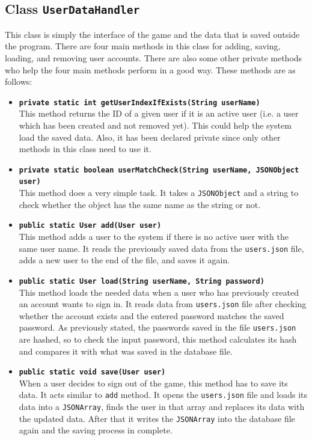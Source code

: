 \documentclass[a4paper]{article}
\begin{document}
\subsection{Class \texttt{UserDataHandler}}
This class is simply the interface of the game and the data that is saved outside the program. There are four main methods in this class for adding, saving, loading, and removing user accounts. There are also some other private methods who help the four main methods perform in a good way. These methods are as follows:
\begin{itemize}
	\item \texttt{\textbf{private static int getUserIndexIfExists(String userName)}}\\
	This method returns the ID of a given user if it is an active user (i.e. a user which has been created and not removed yet). This could help the system load the saved data. Also, it has been declared private since only other methods in this class need to use it.
	
	\item \texttt{\textbf{private static boolean userMatchCheck(String userName, JSONObject user)}}\\
	This method does a very simple task. It takes a \texttt{JSONObject} and a string to check whether the object has the same name as the string or not.
	
	\item \texttt{\textbf{public static User add(User user)}}\\
	This method adds a user to the system if there is no active user with the same user name. It reads the previously saved data from the \texttt{users.json} file, adds a new user to the end of the file, and saves it again.
	
	\item \texttt{\textbf{public static User load(String userName, String password)}}\\
	This method loads the needed data when a user who has previously created an account wants to sign in. It reads data from \texttt{users.json} file after checking whether the account exists and the entered password matches the saved password. As previously stated, the passwords saved in the file \texttt{users.json} are hashed, so to check the input password, this method calculates its hash and compares it with what was saved in the database file.
	
	\item \texttt{\textbf{public static void save(User user)}}\\
	When a user decides to sign out of the game, this method has to save its data. It acts similar to \texttt{add} method. It opens the \texttt{users.json} file and loads its data into a \texttt{JSONArray}, finds the user in that array and replaces its data with the updated data. After that it writes the \texttt{JSONArray} into the database file again and the saving process in complete.
	

\end{itemize}
\end{document}
